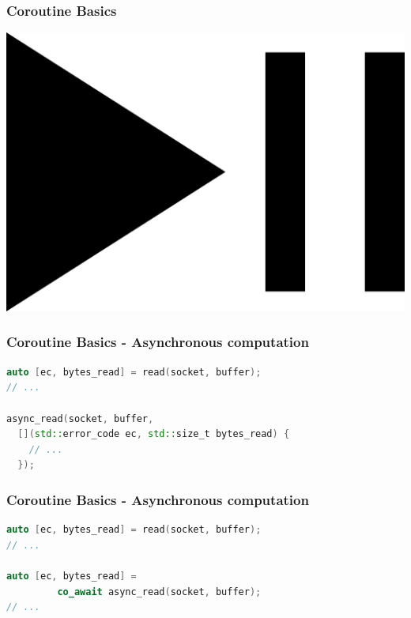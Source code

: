\documentclass[aspectratio=169]{beamer}
\begin{document}
\begin{frame}
  \frametitle{Coroutine Basics}
  
  \begin{center}
  \includegraphics[height=.75\textheight]{corogfx/icon_play_pause.png}
  \end{center}
  
\end{frame}

\begin{frame}[fragile]
  \frametitle{Coroutine Basics - Asynchronous computation}

  \begin{lstlisting}[language={C++}]
auto [ec, bytes_read] = read(socket, buffer);
// ...

async_read(socket, buffer,
  [](std::error_code ec, std::size_t bytes_read) {
    // ...
  });
  \end{lstlisting}
\end{frame}

\begin{frame}[fragile]
  \frametitle{Coroutine Basics - Asynchronous computation}

  \begin{lstlisting}[language={C++}]
auto [ec, bytes_read] = read(socket, buffer);
// ...

auto [ec, bytes_read] =
         co_await async_read(socket, buffer);
// ...
  \end{lstlisting}
\end{frame}
\end{document}
